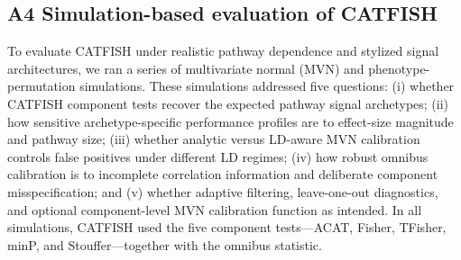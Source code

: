 \documentclass[unnumsec,webpdf,contemporary,large]{oup-authoring-template}%
\theoremstyle{thmstyleone}%
\theoremstyle{thmstyletwo}%
\theoremstyle{thmstylethree}%
\begin{document}
\begin{appendices}








\section{A4 Simulation-based evaluation of CATFISH}

To evaluate CATFISH under realistic pathway dependence and stylized signal architectures, we ran a series of multivariate normal (MVN) and phenotype-permutation simulations. These simulations addressed five questions: (i) whether CATFISH component tests recover the expected pathway signal archetypes; (ii) how sensitive archetype-specific performance profiles are to effect-size magnitude and pathway size; (iii) whether analytic versus LD-aware MVN calibration controls false positives under different LD regimes; (iv) how robust omnibus calibration is to incomplete correlation information and deliberate component misspecification; and (v) whether adaptive filtering, leave-one-out diagnostics, and optional component-level MVN calibration function as intended. In all simulations, CATFISH used the five component tests---ACAT, Fisher, TFisher, minP, and Stouffer---together with the omnibus statistic.


\end{appendices}
\end{document}
